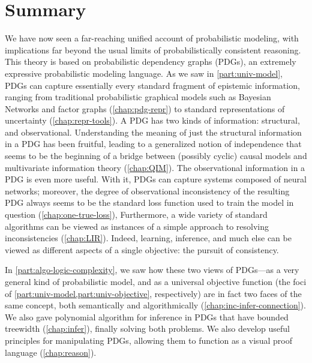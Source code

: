 
\section{Summary}

We have now seen a far-reaching unified account of probabilistic modeling,
    with implications far beyond the usual limits of probabilistically consistent reasoning. 
%
This theory is based on probabilistic dependency graphs (PDGs), an extremely expressive probabilistic modeling language.
As we saw in \cref{part:univ-model}, PDGs can capture essentially every standard fragment of epistemic information, ranging from traditional probabilistic graphical models such as Bayesian Networks and factor graphs (\cref{chap:pdg-repr}) to standard representations of uncertainty (\cref{chap:repr-tools}).
A PDG has two kinds of information: structural, and observational.
Understanding the meaning of just the structural information in a PDG has been fruitful, leading to a generalized notion of independence that seems to be the beginning of a bridge between (possibly cyclic) causal models and multivariate information theory (\cref{chap:QIM}). 
%
The observational information in a PDG is even more useful. 
With it, PDGs can capture systems composed of neural networks; moreover, 
    the degree of observational inconsistency of the resulting PDG always seems to be the standard loss function used to train the model in question (\cref{chap:one-true-loss}),
Furthermore, a wide variety of standard algorithms can be viewed as instances of a simple approach to resolving inconsistencies (\cref{chap:LIR}).
Indeed, learning, inference, and 
    much else can be viewed as different aspects of a single objective: the pursuit of consistency. 

In \cref{part:algo-logic-complexity}, we saw how these two views of PDGs---as a very general kind of probabilistic model, and as a universal objective function (the foci of \cref{part:univ-model,part:univ-objective}, respectively) are in fact two faces of the same concept, both semantically and algorithmically (\cref{chap:inc-infer-connection}). 
We also gave polynomial algorithm for inference in PDGs that have bounded treewidth (\cref{chap:infer}), finally solving both problems. 
{\color{red}%
We also develop useful principles for manipulating PDGs, 
    allowing them to function as a visual proof language (\cref{chap:reason}).
}%


